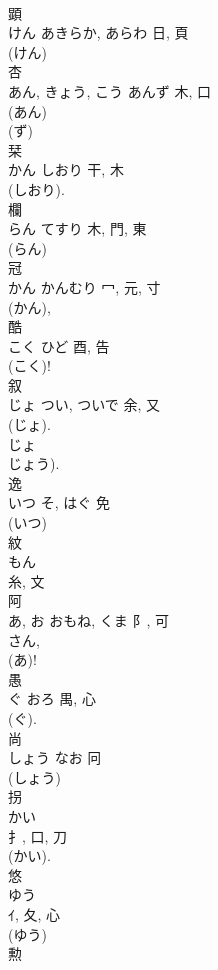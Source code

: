 \documentclass[8pt]{extreport}
\begin{document}
\begin{CJK}{UTF8}{min}
\\	顕	
\\	けん	あきらか, あらわ	日, 頁		
\\	(けん)
\\	杏	
\\	あん, きょう, こう	あんず	木, 口	
\\	(あん) 
\\	(ず) 
\\	栞	
\\	かん	しおり	干, 木	
\\	(しおり).
\\	欄	
\\	らん	てすり	木, 門, 東	
\\	(らん) 
\\	冠	
\\	かん	かんむり	冖, 元, 寸	
\\	(かん), 
\\	酷	
\\	こく	ひど	酉, 告	
\\	(こく)! 
\\	叙	
\\	じょ	つい, ついで	余, 又	
\\	(じょ).	
\\	じょ 
\\	じょう). 
\\	逸	
\\	いつ	そ, はぐ	免		
\\	(いつ) 
\\	紋	
\\	もん	
\\	糸, 文	
\\	阿	
\\	あ, お	おもね, くま	阝, 可	
\\	さん,
\\	(あ)!
\\	愚	
\\	ぐ	おろ	禺, 心	
\\	(ぐ). 
\\	尚	
\\	しょう	なお	冋		
\\	(しょう) 
\\	拐	
\\	かい	
\\	扌, 口, 刀	
\\	(かい). 
\\	悠	
\\	ゆう	
\\	ｲ, 夂, 心		
\\	(ゆう) 
\\	勲	

\end{CJK}
\end{document}
